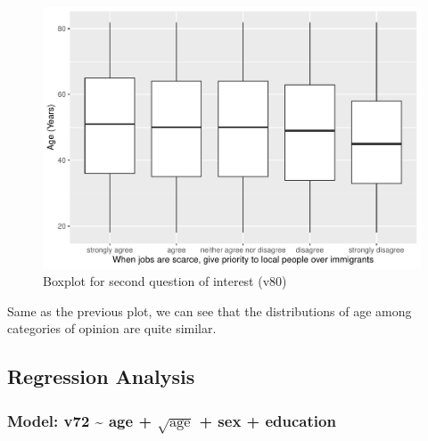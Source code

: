 \documentclass[
]{article}
\newenvironment{Shaded}{\begin{snugshade}}{\end{snugshade}}
\newcommand{\AttributeTok}[1]{\textcolor[rgb]{0.13,0.29,0.53}{#1}}
\newcommand{\DecValTok}[1]{\textcolor[rgb]{0.00,0.00,0.81}{#1}}
\newcommand{\FunctionTok}[1]{\textcolor[rgb]{0.13,0.29,0.53}{\textbf{#1}}}
\newcommand{\NormalTok}[1]{#1}
\newcommand{\OtherTok}[1]{\textcolor[rgb]{0.56,0.35,0.01}{#1}}
\newcommand{\SpecialCharTok}[1]{\textcolor[rgb]{0.81,0.36,0.00}{\textbf{#1}}}
\newcommand{\StringTok}[1]{\textcolor[rgb]{0.31,0.60,0.02}{#1}}
\begin{document}
\begin{figure}

{\centering \includegraphics[width=0.6\linewidth]{Report-for-statisticians_files/figure-latex/plot_v80-1} 

}

\caption{Boxplot for second question of interest (v80)}\label{fig:plot_v80}
\end{figure}

Same as the previous plot, we can see that the distributions of age
among categories of opinion are quite similar.

\hypertarget{regression-analysis}{%
\subsection{Regression Analysis}\label{regression-analysis}}

\hypertarget{model-v72-age-sqrttextage-sex-education}{%
\subsubsection{\texorpdfstring{Model: v72 \textasciitilde{} age +
\(\sqrt{\text{age}}\) + sex +
education}{Model: v72 \textasciitilde{} age + \textbackslash sqrt\{\textbackslash text\{age\}\} + sex + education}}\label{model-v72-age-sqrttextage-sex-education}}

\begin{Shaded}
\end{Shaded}
\end{document}
